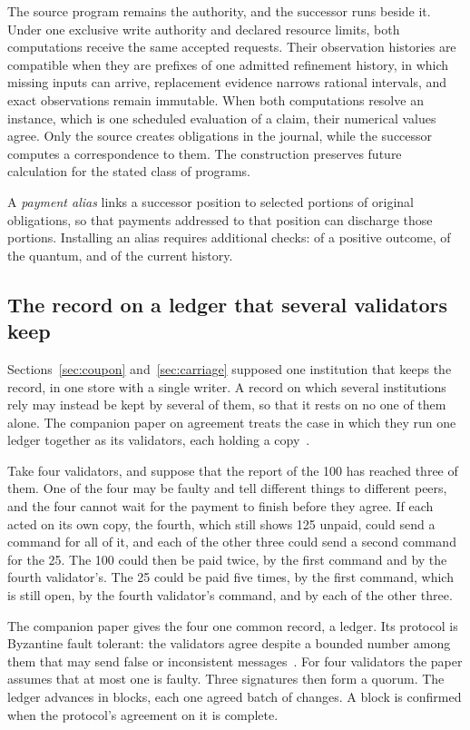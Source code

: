 \documentclass{momentum}
\begin{document}
The source program remains the authority, and the successor runs beside it. Under one exclusive write authority and declared resource limits, both computations receive the same accepted requests. Their observation histories are compatible when they are prefixes of one admitted refinement history, in which missing inputs can arrive, replacement evidence narrows rational intervals, and exact observations remain immutable. When both computations resolve an instance, which is one scheduled evaluation of a claim, their numerical values agree. Only the source creates obligations in the journal, while the successor computes a correspondence to them. The construction preserves future calculation for the stated class of programs.

A \emph{payment alias} links a successor position to selected portions of original obligations, so that payments addressed to that position can discharge those portions. Installing an alias requires additional checks: of a positive outcome, of the quantum, and of the current history.

\subsection{The record on a ledger that several validators keep}
\label{sec:agreement}

Sections~\ref{sec:coupon} and~\ref{sec:carriage} supposed one institution that keeps the record, in one store with a single writer. A record on which several institutions rely may instead be kept by several of them, so that it rests on no one of them alone. The companion paper on agreement treats the case in which they run one ledger together as its validators, each holding a copy~\cite{event}.

Take four validators, and suppose that the report of the 100 has reached three of them. One of the four may be faulty and tell different things to different peers, and the four cannot wait for the payment to finish before they agree. If each acted on its own copy, the fourth, which still shows 125 unpaid, could send a command for all of it, and each of the other three could send a second command for the 25. The 100 could then be paid twice, by the first command and by the fourth validator's. The 25 could be paid five times, by the first command, which is still open, by the fourth validator's command, and by each of the other three.

The companion paper gives the four one common record, a ledger. Its protocol is Byzantine fault tolerant: the validators agree despite a bounded number among them that may send false or inconsistent messages~\cite{lamport82}. For four validators the paper assumes that at most one is faulty. Three signatures then form a quorum. The ledger advances in blocks, each one agreed batch of changes. A block is confirmed when the protocol's agreement on it is complete.
\end{document}
